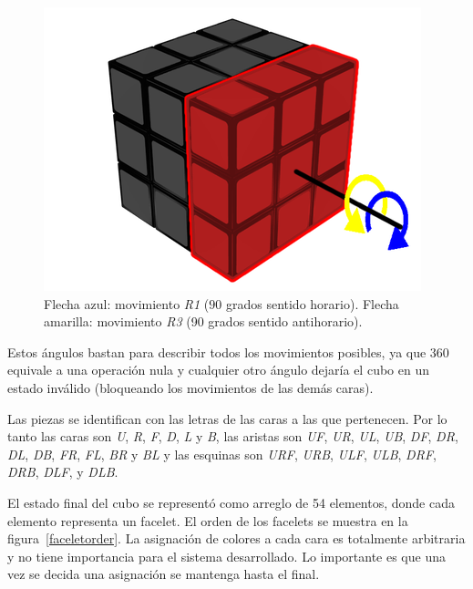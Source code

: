 \begin{figure}
	\centering
	\includegraphics[scale=0.3]{figures/R1}
	\caption{Flecha azul: movimiento \textit{R1} ($90$ grados sentido horario). Flecha amarilla: movimiento \textit{R3} (90 grados sentido antihorario).}
	\label{moveR}
\end{figure}

Estos ángulos bastan para describir todos los movimientos posibles, ya que 360 equivale a una operación nula y cualquier otro ángulo dejaría el cubo en un estado inválido (bloqueando los movimientos de las demás caras).

Las piezas se identifican con las letras de las caras a las que pertenecen. Por lo tanto las caras son \textit{U}, \textit{R}, \textit{F}, \textit{D}, \textit{L} y \textit{B}, las aristas son \textit{UF}, \textit{UR}, \textit{UL}, \textit{UB}, \textit{DF}, \textit{DR}, \textit{DL}, \textit{DB}, \textit{FR}, \textit{FL}, \textit{BR} y \textit{BL} y las esquinas son \textit{URF}, \textit{URB}, \textit{ULF}, \textit{ULB}, \textit{DRF}, \textit{DRB}, \textit{DLF}, y \textit{DLB}.

El estado final del cubo se representó como arreglo de 54 elementos, donde cada elemento representa un facelet. El orden de los facelets se muestra en la figura~\ref{faceletorder}.
La asignación de colores a cada cara es totalmente arbitraria y no tiene importancia para el sistema desarrollado. Lo importante es que una vez se decida una asignación se mantenga hasta el final.


